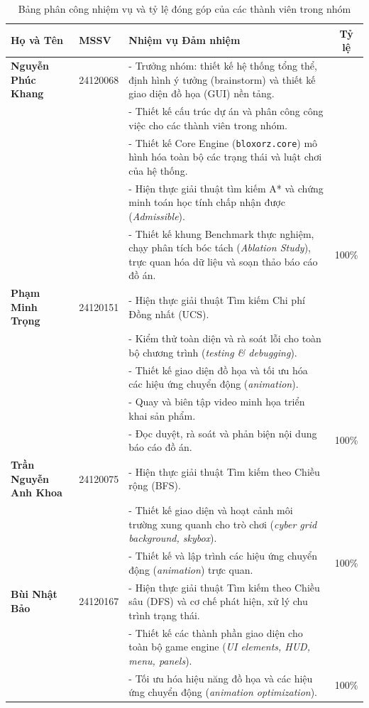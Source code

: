 \begin{table}[H]
\centering
\caption{Bảng phân công nhiệm vụ và tỷ lệ đóng góp của các thành viên
trong nhóm}
\label{tab:team_contributions}
\small
\begin{tabularx}{\textwidth}{l l X c}
\toprule
\textbf{Họ và Tên} & \textbf{MSSV}
& \textbf{Nhiệm vụ Đảm nhiệm} & \textbf{Tỷ lệ} \\
\midrule
\textbf{Nguyễn Phúc Khang} & 24120068 &
- Trưởng nhóm: thiết kế hệ thống tổng thể, định hình ý tưởng (brainstorm) và thiết kế giao diện đồ họa (GUI) nền tảng.\\
& & - Thiết kế cấu trúc dự án và phân công công việc cho các thành viên trong nhóm.\\
& & - Thiết kế Core Engine (\texttt{bloxorz.core}) mô hình hóa toàn bộ các trạng thái và luật chơi của hệ thống.\\
& & - Hiện thực giải thuật tìm kiếm A* và chứng minh toán học tính chấp nhận được (\textit{Admissible}).\\
& & - Thiết kế khung Benchmark thực nghiệm, chạy phân tích bóc tách (\textit{Ablation Study}), trực quan hóa dữ liệu và soạn thảo báo cáo đồ án. & 100\% \\
\midrule
\textbf{Phạm Minh Trọng} & 24120151 &
- Hiện thực giải thuật Tìm kiếm Chi phí Đồng nhất (UCS).\\
& & - Kiểm thử toàn diện và rà soát lỗi cho toàn bộ chương trình (\textit{testing \& debugging}).\\
& & - Thiết kế giao diện đồ họa và tối ưu hóa các hiệu ứng chuyển động (\textit{animation}).\\
& & - Quay và biên tập video minh họa triển khai sản phẩm.\\
& & - Đọc duyệt, rà soát và phản biện nội dung báo cáo đồ án. & 100\% \\
\midrule
\textbf{Trần Nguyễn Anh Khoa} & 24120075 &
- Hiện thực giải thuật Tìm kiếm theo Chiều rộng (BFS).\\
& & - Thiết kế giao diện và hoạt cảnh môi trường xung quanh cho trò chơi (\textit{cyber grid background, skybox}).\\
& & - Thiết kế và lập trình các hiệu ứng chuyển động (\textit{animation}) trực quan. & 100\% \\
\midrule
\textbf{Bùi Nhật Bảo} & 24120167 &
- Hiện thực giải thuật Tìm kiếm theo Chiều sâu (DFS) và cơ chế phát hiện, xử lý chu trình trạng thái.\\
& & - Thiết kế các thành phần giao diện cho toàn bộ game engine (\textit{UI elements, HUD, menu, panels}).\\
& & - Tối ưu hóa hiệu năng đồ họa và các hiệu ứng chuyển động (\textit{animation optimization}). & 100\% \\
\bottomrule
\end{tabularx}
\end{table}


